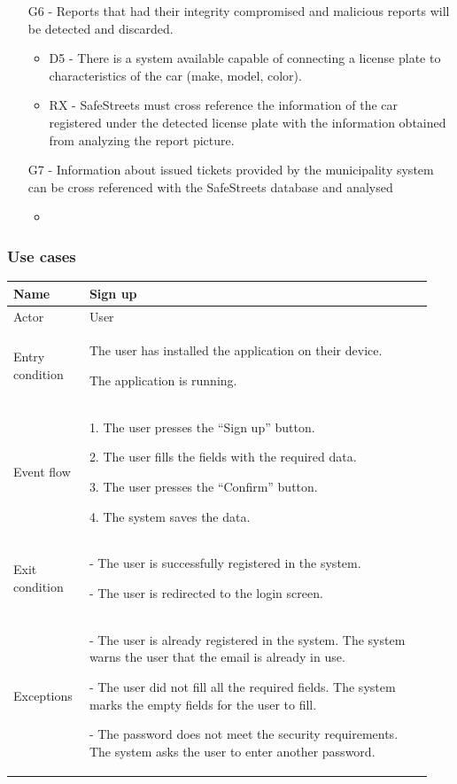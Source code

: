 \begin{itemize}
\item
[G6] - Reports that had their integrity compromised and malicious reports will be detected and discarded.
    \begin{itemize}
    \item
	D5 - There is a system available capable of connecting a license plate to characteristics of the car (make, model, color).
    \item
	RX - SafeStreets must cross reference the information of the car registered under the detected license plate with the information obtained from analyzing the report picture.
    \end{itemize}
\item
[G7] - Information about issued tickets provided by the municipality system can be cross referenced with the SafeStreets database and analysed 
    \begin{itemize}
    \item
    \end{itemize} 
 \end{itemize}

\subsubsection{Use cases}

\begin{table}[H]
\begin{tabular}{|p{0.17\linewidth}|p{0.77\linewidth}|}
\hline
Name            & Sign up
\\ \hline

Actor           & User
\\ \hline

Entry condition &
The user has installed the application on their device.

The application is running.
\\ \hline
Event flow      & 
    1. The user presses the “Sign up” button.

    2. The user fills the fields with the required data.

    3. The user presses the “Confirm” button.

    4. The system saves the data.
\\ \hline
Exit condition  & 
 - The user is successfully registered in the system.

 - The user is redirected to the login screen.
\\ \hline
Exceptions      &
    - The user is already registered in the system. The system warns the user that the email is already in use. 

    - The user did not fill all the required fields. The system marks the empty fields for the user to fill.

    - The password does not meet the security requirements. The system asks the user to enter another password.
\\ \hline
\end{tabular}
\end{table}

